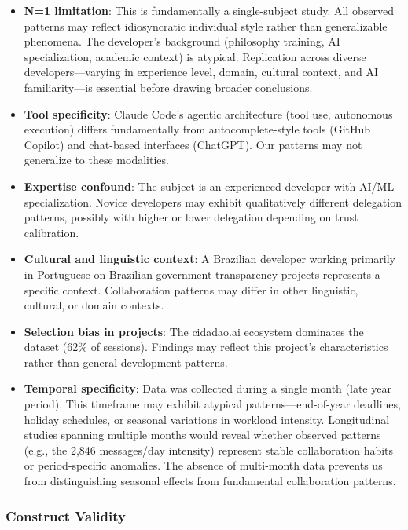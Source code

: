 \begin{itemize}
    \item \textbf{N=1 limitation}: This is fundamentally a single-subject study. All observed patterns may reflect idiosyncratic individual style rather than generalizable phenomena. The developer's background (philosophy training, AI specialization, academic context) is atypical. Replication across diverse developers---varying in experience level, domain, cultural context, and AI familiarity---is essential before drawing broader conclusions.

    \item \textbf{Tool specificity}: Claude Code's agentic architecture (tool use, autonomous execution) differs fundamentally from autocomplete-style tools (GitHub Copilot) and chat-based interfaces (ChatGPT). Our patterns may not generalize to these modalities.

    \item \textbf{Expertise confound}: The subject is an experienced developer with AI/ML specialization. Novice developers may exhibit qualitatively different delegation patterns, possibly with higher or lower delegation depending on trust calibration.

    \item \textbf{Cultural and linguistic context}: A Brazilian developer working primarily in Portuguese on Brazilian government transparency projects represents a specific context. Collaboration patterns may differ in other linguistic, cultural, or domain contexts.

    \item \textbf{Selection bias in projects}: The cidadao.ai ecosystem dominates the dataset (62\% of sessions). Findings may reflect this project's characteristics rather than general development patterns.

    \item \textbf{Temporal specificity}: Data was collected during a single month (late year period). This timeframe may exhibit atypical patterns---end-of-year deadlines, holiday schedules, or seasonal variations in workload intensity. Longitudinal studies spanning multiple months would reveal whether observed patterns (e.g., the 2,846 messages/day intensity) represent stable collaboration habits or period-specific anomalies. The absence of multi-month data prevents us from distinguishing seasonal effects from fundamental collaboration patterns.
\end{itemize}

\subsubsection{Construct Validity}

